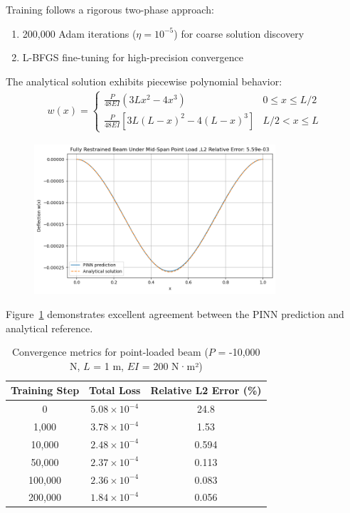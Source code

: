\documentclass[12pt]{article}
\begin{document}
Training follows a rigorous two-phase approach: 
\begin{enumerate}
    \item 200,000 Adam iterations ($\eta = 10^{-5}$) for coarse solution discovery
    \item L-BFGS fine-tuning for high-precision convergence
\end{enumerate}

The analytical solution exhibits piecewise polynomial behavior:
\begin{align*}
w(x) = 
\begin{cases} 
\frac{P}{48EI}(3Lx^2 - 4x^3) & 0 \leq x \leq L/2 \\
\frac{P}{48EI}[3L(L-x)^2 - 4(L-x)^3] & L/2 < x \leq L 
\end{cases}
\end{align*}

\begin{figure}[htbp]
  \centering
  \includegraphics[width=0.8\textwidth]{mid_span_restrained_results}
  \caption{}
  \label{fig:mid-span_restrained}
\end{figure}

Figure~\ref{fig:mid-span_restrained} demonstrates excellent agreement between the PINN prediction and analytical reference.

\begin{table}[htbp]
\centering
\begin{tabular}{c c c}
\toprule
\textbf{Training Step} & \textbf{Total Loss} & \textbf{Relative L2 Error (\%)} \\
\midrule
0 & $5.08 \times 10^{-4}$ & 24.8 \\
1,000 & $3.78 \times 10^{-4}$ & 1.53 \\
10,000 & $2.48 \times 10^{-4}$ & 0.594 \\
50,000 & $2.37 \times 10^{-4}$ & 0.113 \\
100,000 & $2.36 \times 10^{-4}$ & 0.083 \\
200,000 & $1.84 \times 10^{-4}$ & 0.056 \\
\bottomrule
\end{tabular}
\caption{Convergence metrics for point-loaded beam ($P$ = -10,000 N, $L$ = 1 m, $EI$ = 200 N·m²)}
\label{tab:point_convergence}
\end{table}
\end{document}
